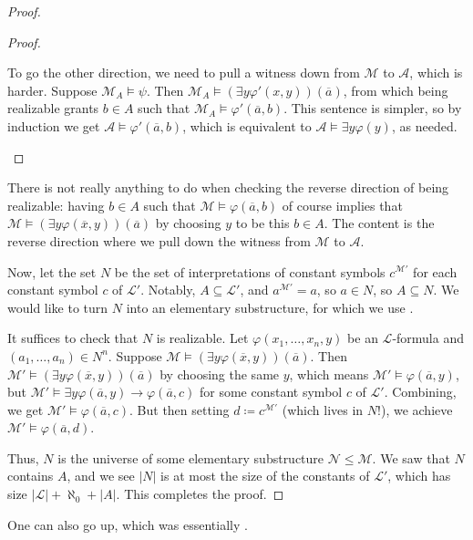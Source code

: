 \documentclass[../notes.tex]{subfiles}
\begin{document}
\begin{proof}
\begin{proof}
\begin{itemize}
\begin{itemize}
				To go the other direction, we need to pull a witness down from $\mathcal M$ to $\mathcal A$, which is harder. Suppose $\mathcal M_A\models\psi$. Then $\mathcal M_A\models(\exists y\varphi'(x,y))(\overline a)$, from which being realizable grants $b\in A$ such that $\mathcal M_A\models\varphi'(\overline a,b)$. This sentence is simpler, so by induction we get $\mathcal A\models\varphi'(\overline a,b)$, which is equivalent to $\mathcal A\models\exists y\varphi(y)$, as needed.
				\qedhere
			\end{itemize}
		\end{itemize}
	\end{proof}
	\begin{remark}
		There is not really anything to do when checking the reverse direction of being realizable: having $b\in A$ such that $\mathcal M\models\varphi(\overline a,b)$ of course implies that $\mathcal M\models(\exists y\varphi(\overline x,y))(\overline a)$ by choosing $y$ to be this $b\in A$. The content is the reverse direction where we pull down the witness from $\mathcal M$ to $\mathcal A$.
	\end{remark}
	Now, let the set $N$ be the set of interpretations of constant symbols $c^{\mathcal M'}$ for each constant symbol $c$ of $\mathcal L'$. Notably, $A\subseteq\mathcal L'$, and $a^{\mathcal M'}=a$, so $a\in N$, so $A\subseteq N$. We would like to turn $N$ into an elementary substructure, for which we use .
	
	It suffices to check that $N$ is realizable. Let $\varphi(x_1,\ldots,x_n,y)$ be an $\mathcal L$-formula and $(a_1,\ldots,a_n)\in N^n$. Suppose $\mathcal M\models(\exists y\varphi(\overline x,y))(\overline a)$. Then $\mathcal M'\models(\exists y\varphi(\overline x,y))(\overline a)$ by choosing the same $y$, which means $\mathcal M'\models\varphi(\overline a,y)$, but $\mathcal M'\models\exists y\varphi(\overline a,y)\to\varphi(\overline a,c)$ for some constant symbol $c$ of $\mathcal L'$. Combining, we get $\mathcal M'\models\varphi(\overline a,c)$. But then setting $d\coloneqq c^{\mathcal M'}$ (which lives in $N$!), we achieve $\mathcal M'\models\varphi(\overline a,d)$.

	Thus, $N$ is the universe of some elementary substructure $\mathcal N\le\mathcal M$. We saw that $N$ contains $A$, and we see $\left|N\right|$ is at most the size of the constants of $\mathcal L'$, which has size $\left|\mathcal L\right|+\aleph_0+\left|A\right|$. This completes the proof.
\end{proof}
One can also go up, which was essentially .
\end{document}
